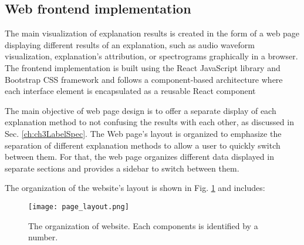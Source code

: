 \documentclass[
    bindingoffset=5mm,  %
    footnoteindent=3mm, %
    hyphenation=true    %
]{src/wut-thesis}
\begin{document}
\subsection{Web frontend implementation} \label{ch:ch5WebFrontend}

The main visualization of explanation results is created in the form of a web page displaying different results of
an explanation, such as audio waveform visualization, explanation’s attribution, or spectrograms graphically in a
browser. The frontend implementation is built using the React JavaScript library \cite{ReactDOC}
and Bootstrap CSS framework \cite{BootstrapDOC} and follows a component-based architecture where each interface
element is encapsulated as a reusable React component


The main objective of web page design is to offer a separate display of each explanation method to not
confusing the results with each other, as discussed in Sec. \ref{ch:ch3LabelSpec}.
The Web page’s layout is organized to emphasize the separation of different explanation methods to allow
a user to quickly switch between them. For that, the web page organizes different data displayed in
separate sections and provides a sidebar to switch between them.

The organization of the website's layout is shown in Fig. \ref{fig:PageLayout} and includes:

\begin{figure}[h!] %
    \centering
    \texttt{[image: page\_layout.png]}
    \caption{The organization of website. Each components is identified by a number.}
    \label{fig:PageLayout}
\end{figure}
\end{document}
